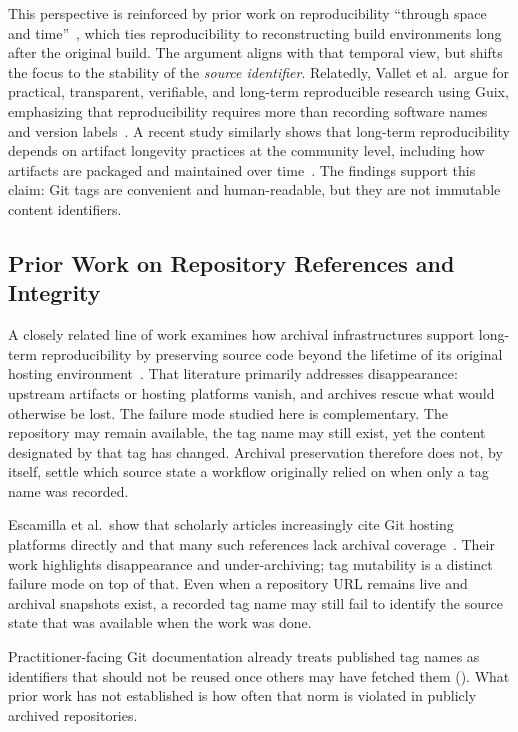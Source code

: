 This perspective is reinforced by prior work on reproducibility ``through space and time''~\cite{DBLP:conf/icse/MalkaZZ24}, which ties reproducibility to reconstructing build environments long after the original build.
The argument aligns with that temporal view, but shifts the focus to the stability of the \emph{source identifier}.
Relatedly, Vallet et al.~argue for practical, transparent, verifiable, and long-term reproducible research using Guix, emphasizing that reproducibility requires more than recording software names and version labels~\cite{valletPracticalTransparentVerifiable2022}.
A recent study similarly shows that long-term reproducibility depends on artifact longevity practices at the community level, including how artifacts are packaged and maintained over time~\cite{DBLP:conf/acmrep/GuilloteauCPGR24}.
The findings support this claim: Git tags are convenient and human-readable, but they are not immutable content identifiers.

\subsection{Prior Work on Repository References and Integrity}
\label{subsec:tags-rw-refs-integrity}

A closely related line of work examines how archival infrastructures support long-term reproducibility by preserving source code beyond the lifetime of its original hosting environment~\cite{10.1145/3641525.3663622}.
That literature primarily addresses disappearance: upstream artifacts or hosting platforms vanish, and archives rescue what would otherwise be lost.
The failure mode studied here is complementary.
The repository may remain available, the tag name may still exist, yet the content designated by that tag has changed.
Archival preservation therefore does not, by itself, settle which source state a workflow originally relied on when only a tag name was recorded.

Escamilla et al.~show that scholarly articles increasingly cite Git hosting platforms directly and that many such references lack archival coverage~\cite{DBLP:conf/ercimdl/EscamillaKCRWN21,DBLP:conf/icadl/EscamillaKCRWN23}.
Their work highlights disappearance and under-archiving; tag mutability is a distinct failure mode on top of that.
Even when a repository URL remains live and archival snapshots exist, a recorded tag name may still fail to identify the source state that was available when the work was done.

Practitioner-facing Git documentation already treats published tag names as identifiers that should not be reused once others may have fetched them ().
What prior work has not established is how often that norm is violated in publicly archived repositories.

